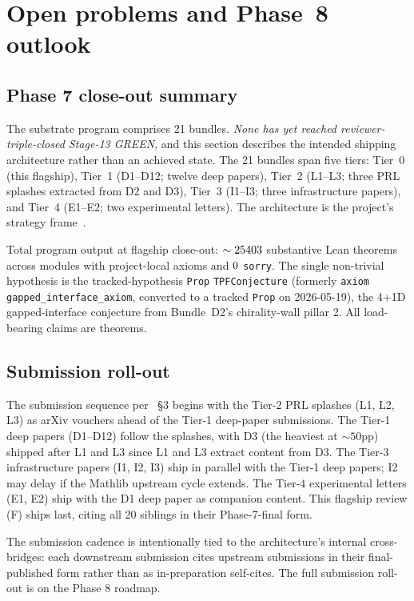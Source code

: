 \documentclass[aps,prd,reprint,nofootinbib,superscriptaddress]{revtex4-2}
\begin{document}
\section{Open problems and Phase~8 outlook}
\label{sec:open-problems}

\subsection{Phase 7 close-out summary}
\label{sec:phase7-closeout}

The substrate program comprises 21 bundles. \emph{None has yet
reached reviewer-triple-closed Stage-13 GREEN}, and this section
describes the intended shipping architecture rather than an achieved
state. The 21 bundles span five tiers: Tier~0 (this flagship),
Tier~1 (D1--D12; twelve deep papers), Tier~2 (L1--L3; three PRL
splashes extracted from D2 and D3), Tier~3 (I1--I3; three
infrastructure papers), and Tier~4 (E1--E2; two experimental
letters). The
architecture is the project's strategy
frame~\cite{Roehm2026Strategy}.

Total program output at flagship close-out:
$\sim 25403$ substantive Lean theorems across
\leanmodules{} modules with \axiomcount{} project-local axioms and
$0$ \texttt{sorry}.
The single non-trivial hypothesis is the tracked-hypothesis
\texttt{Prop} \texttt{TPFConjecture} (formerly
\texttt{axiom gapped\_interface\_axiom}, converted to a tracked
\texttt{Prop} on 2026-05-19), the 4+1D gapped-interface conjecture
from Bundle~D2's chirality-wall pillar 2.
All load-bearing claims are theorems.

\subsection{Submission roll-out}

The submission sequence per~\cite{Roehm2026Strategy} \S 3 begins with
the Tier-2 PRL splashes (L1, L2, L3) as arXiv vouchers ahead of the
Tier-1 deep-paper submissions. The Tier-1 deep papers (D1--D12)
follow the splashes, with D3 (the heaviest at $\sim 50$pp)
shipped after L1 and L3 since L1 and L3 extract content from D3.
The Tier-3 infrastructure papers (I1, I2, I3) ship in parallel with
the Tier-1 deep papers; I2 may delay if the Mathlib upstream cycle
extends. The Tier-4 experimental letters (E1, E2) ship with the D1
deep paper as companion content. This flagship review (F) ships last,
citing all 20 siblings in their Phase-7-final form.

The submission cadence is intentionally tied to the architecture's
internal cross-bridges: each downstream submission cites upstream
submissions in their final-published form rather than as in-preparation
self-cites. The full submission roll-out is on the Phase 8 roadmap.
\end{document}
